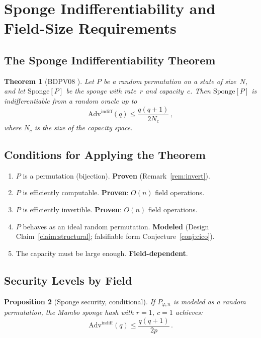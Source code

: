 \documentclass[11pt,a4paper]{article}
\newtheorem{theorem}{Theorem}[section]
\newtheorem{proposition}[theorem]{Proposition}
\theoremstyle{definition}
\begin{document}
\section{Sponge Indifferentiability and Field-Size Requirements}\label{sec:sponge}

\subsection{The Sponge Indifferentiability Theorem}

\begin{theorem}[BDPV08 {\cite{BDPV08}}]\label{thm:sponge}
Let $P$ be a random permutation on a state of size~$N$, and let
$\mathrm{Sponge}[P]$ be the sponge with rate~$r$ and capacity~$c$. Then
$\mathrm{Sponge}[P]$ is indifferentiable from a random oracle up to
\[
  \mathrm{Adv}^{\mathrm{indiff}}(q) \le \frac{q(q+1)}{2N_c}\,,
\]
where $N_c$ is the size of the capacity space.
\end{theorem}


\subsection{Conditions for Applying the Theorem}

\begin{enumerate}[nosep]
  \item $P$ is a permutation (bijection). \textbf{Proven}
        (Remark~\ref{rem:invert}).
  \item $P$ is efficiently computable. \textbf{Proven}: $O(n)$ field
        operations.
  \item $P$ is efficiently invertible. \textbf{Proven}: $O(n)$ field
        operations.
  \item $P$ behaves as an ideal random permutation.
        \textbf{Modeled} (Design Claim~\ref{claim:structural};
        falsifiable form Conjecture~\ref{conj:cico}).
  \item The capacity must be large enough. \textbf{Field-dependent}.
\end{enumerate}


\subsection{Security Levels by Field}

\begin{proposition}[Sponge security, conditional]\label{prop:sponge_sec}
If $P_{\varphi,n}$ is modeled as a random permutation, the Mambo sponge hash
with $r=1$, $c=1$ achieves:
\[
  \mathrm{Adv}^{\mathrm{indiff}}(q) \le \frac{q(q+1)}{2p}\,.
\]
\end{proposition}
\end{document}
